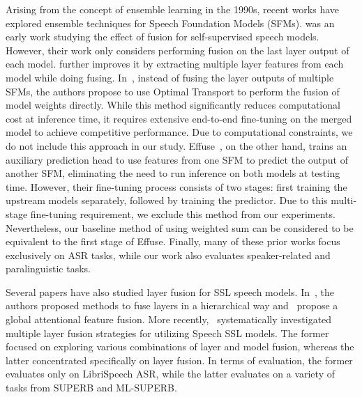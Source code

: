Arising from the concept of ensemble learning in the 1990s, recent works have explored ensemble techniques for Speech Foundation Models (SFMs). \cite{arunkumar22b_SSLFusion} was an early work studying the effect of fusion for self-supervised speech models. 
However, their work only considers performing fusion on the last layer output of each model.
\cite{tang22_fusion} further improves it by extracting multiple layer features from each model while doing fusing.
In~\cite{fu23b_otf}, instead of fusing the layer outputs of multiple SFMs, the authors propose to use Optimal Transport to perform the fusion of model weights directly.
While this method significantly reduces computational cost at inference time, it requires extensive end-to-end fine-tuning on the merged model to achieve competitive performance.
Due to computational constraints, we do not include this approach in our study.
Effuse~\cite{srivastava24_effuse}, on the other hand, trains an auxiliary prediction head to use features from one SFM to predict the output of another SFM, eliminating the need to run inference on both models at testing time.
However, their fine-tuning process consists of two stages: first training the upstream models separately, followed by training the predictor.
Due to this multi-stage fine-tuning requirement, we exclude this method from our experiments.
Nevertheless, our baseline method of using weighted sum can be considered to be equivalent to the first stage of Effuse.
Finally, many of these prior works focus exclusively on ASR tasks, while our work also evaluates speaker-related and paralinguistic tasks.

Several papers have also studied layer fusion for SSL speech models. In~\cite{huo23_hff}, the authors proposed methods to fuse layers in a hierarchical way and~\cite{huo23b_gaff} propose a global attentional feature fusion.
More recently,~\cite{chiu24_sinica,shih24_interface} systematically investigated multiple layer fusion strategies for utilizing Speech SSL models.
The former focused on exploring various combinations of layer and model fusion, whereas the latter concentrated specifically on layer fusion.
In terms of evaluation, the former evaluates only on LibriSpeech ASR, while the latter evaluates on a variety of tasks from SUPERB and ML-SUPERB.


